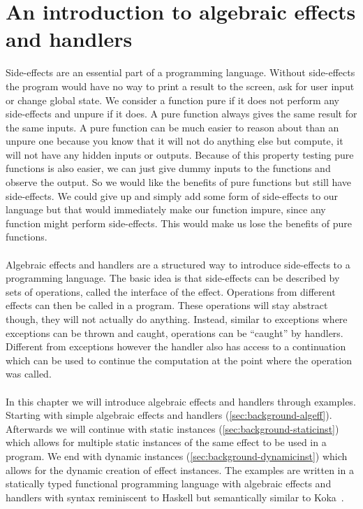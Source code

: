 \chapter{\label{chap:algintro}An introduction to algebraic effects and handlers}

Side-effects are an essential part of a programming language. Without side-effects the program would have no way to print a result to the screen, ask for user input or change global state. We consider a function pure if it does not perform any side-effects and unpure if it does. A pure function always gives the same result for the same inputs. A pure function can be much easier to reason about than an unpure one because you know that it will not do anything else but compute, it will not have any hidden inputs or outputs. Because of this property testing pure functions is also easier, we can just give dummy inputs to the functions and observe the output. So we would like the benefits of pure functions but still have side-effects. We could give up and simply add some form of side-effects to our language but that would immediately make our function impure, since any function might perform side-effects. This would make us lose the benefits of pure functions.
\\\\
Algebraic effects and handlers are a structured way to introduce side-effects to a programming language.
The basic idea is that side-effects can be described by sets of operations, called the interface of the effect.
Operations from different effects can then be called in a program.
These operations will stay abstract though, they will not actually do anything.
Instead, similar to exceptions where exceptions can be thrown and caught, operations can be ``caught'' by handlers.
Different from exceptions however the handler also has access to a continuation which can be used to continue the computation at the point where the operation was called.
\\\\
In this chapter we will introduce algebraic effects and handlers through examples.
Starting with simple algebraic effects and handlers (\cref{sec:background-algeff}).
Afterwards we will continue with static instances (\cref{sec:background-staticinst}) which allows for multiple static instances of the same effect to be used in a program.
We end with dynamic instances (\cref{sec:background-dynamicinst}) which allows for the dynamic creation of effect instances. The examples are written in a statically typed functional programming language with algebraic effects and handlers with syntax reminiscent to Haskell but semantically similar to Koka~\autocite{koka2}.

